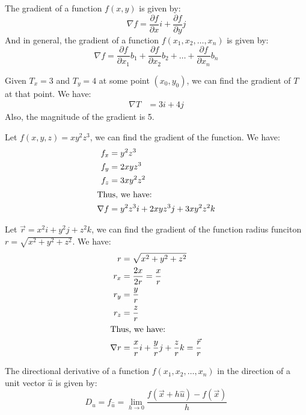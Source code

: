 \documentclass[11pt]{article}
\begin{document}
\begin{theorem}
    The gradient of a function $f(x, y)$ is given by:
    \begin{equation}
        \nabla f = \frac{\partial f}{\partial x}i + \frac{\partial f}{\partial y}j
    \end{equation}
    And in general, the gradient of a function $f(x_1, x_2, \dots, x_n)$ is given by:
    \begin{equation}
        \nabla f = \frac{\partial f}{\partial x_1}b_1 + \frac{\partial f}{\partial x_2}b_2 + \dots + \frac{\partial f}{\partial x_n}b_n
    \end{equation}
\end{theorem}
\begin{example}
    Given $T_x = 3$ and $T_y = 4$ at some point $(x_0, y_0)$, we can find the gradient of $T$ at that point. We have:
    \begin{align*}
        \nabla T &= 3i + 4j
    \end{align*}
    Also, the magnitude of the gradient is 5.
\end{example}
\begin{example}
    Let $f(x, y, z) = xy^2z^3$, we can find the gradient of the function. We have:
    \begin{align*}
        f_x &= y^2z^3 \\
        f_y &= 2xyz^3 \\
        f_z &= 3xy^2z^2 \\
        \intertext{Thus, we have:}
        \nabla f &= y^2z^3i + 2xyz^3j + 3xy^2z^2k
    \end{align*}
\end{example}
\begin{example}
    Let $\vec{r} = x^2i + y^2j + z^2k$, we can find the gradient of the function radius funciton $r = \sqrt{x^2 + y^2 + z^2}$. We have:
    \begin{align*}
        r &= \sqrt{x^2 + y^2 + z^2} \\
        r_x &= \frac{2x}{2r} = \frac{x}{r} \\
        r_y &= \frac{y}{r} \\
        r_z &= \frac{z}{r} \\
        \intertext{Thus, we have:}
        \nabla r &= \frac{x}{r}i + \frac{y}{r}j + \frac{z}{r}k = \frac{\vec{r}}{r}
    \end{align*}
\end{example}
\begin{definition}
    The directional derivative of a function $f(x_1, x_2, \dots, x_n)$ in the direction of a unit vector $\hat{u}$ is given by:
    \begin{equation}
        D_{\hat{u}} = f_{\hat{u}} = \lim_{h \to 0} \frac{f(\vec{x} + h\hat{u}) - f(\vec{x})}{h}
    \end{equation}
\end{definition}
\end{document}

